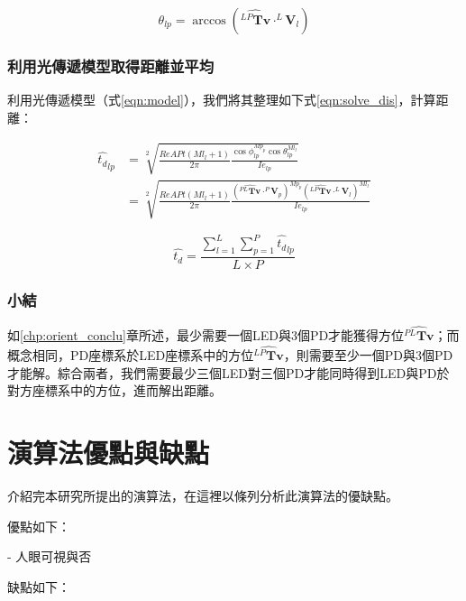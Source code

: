         \begin{equation}
            \label{eqn:solve_outang}
            \theta_{lp} = \arccos(\hat{{^{LP}\boldsymbol{Tv}}}\cdot ^L\boldsymbol{V}_l)
        \end{equation}

        \subsubsection{利用光傳遞模型取得距離並平均}
        \label{chp:dis_average}

        利用光傳遞模型（式\ref{eqn:model}），我們將其整理如下式\ref{eqn:solve_dis}，計算距離：

        \begin{equation}
            \label{eqn:solve_dis}
            \begin{aligned}
            \hat{t_d }_{lp} &= \sqrt[2]{\frac{ReAPt (Ml_{l}+1)}{2\pi}
                \frac{\cos\phi_{lp}^{Mp_{p}}\cos \theta_{lp}^{Ml_{l}} }
                {Ie_{lp}}
            }\\
            & = \sqrt[2]
            {
                \frac{ReAPt (Ml_{l}+1)}{2\pi}
                \frac{
                    (\hat{{^{PL}\boldsymbol{Tv}}}\cdot ^P\boldsymbol{V}_p)^{Mp_{p}}
                    (\hat{{^{LP}\boldsymbol{Tv}}}\cdot ^L\boldsymbol{V}_l)^{Ml_{l}} }
                {Ie_{lp}}
            }
            \end{aligned}
        \end{equation}




        \begin{equation}
            \label{eqn:average_dis}
            \hat{t_d }= \frac{\sum^{L}_{l=1}\sum^{P}_{p=1} \hat{t_d }_{lp} }{L\times P}
        \end{equation}

        \subsubsection{小結}

        如\ref{chp:orient_conclu}章所述，最少需要一個LED與3個PD才能獲得方位$\hat{{^{PL}\boldsymbol{Tv}}}$；而概念相同，PD座標系於LED座標系中的方位$\hat{{^{LP}\boldsymbol{Tv}}}$，則需要至少一個PD與3個PD才能解。綜合兩者，我們需要最少三個LED對三個PD才能同時得到LED與PD於對方座標系中的方位，進而解出距離。


\section{演算法優點與缺點}


介紹完本研究所提出的演算法，在這裡以條列分析此演算法的優缺點。

優點如下：

\begin{description}

    \item[- 人眼可視與否]\hfill 
    
    \qquad

\end{description}

缺點如下：












